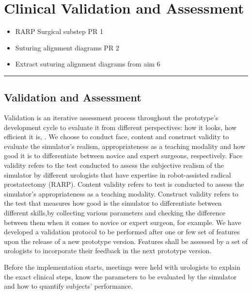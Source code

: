 
\section{Clinical Validation and Assessment}
\label{sec:clinical_validation}

\begin{itemize}
  \item RARP Surgical substep PR 1 
  \item Suturing alignment diagrams PR 2 
  \item Extract suturing alignment diagrams from aim 6 
\end{itemize}

\hrule%

\subsection{Validation and Assessment}
\label{ssec:validation_assessment}


Validation is an iterative assessment process throughout the prototype's development cycle to evaluate it from different perspectives: how it looks, how efficient it is, \etc. We choose to conduct face, content and construct validity to evaluate the simulator's realism, appropriateness as a teaching modality and how good it is to differentiate between novice and expert surgeons, respectively.
Face validity refers to the test conducted to assess the subjective realism of the simulator by different urologists that have expertise in robot-assisted radical prostatectomy (RARP). Content validity refers to test is conducted to assess the simulator’s appropriateness as a teaching modality. Construct validity refers to the test that measures how good is the simulator to differentiate between different skills,by collecting various parameters and checking the difference between them when it comes to novice or expert surgeon, for example.
We have developed a validation protocol to be performed after one or few set of features upon the release of a new prototype version. Features shall be assessed by a set of urologists to incorporate their feedback in the next prototype version.

Before the implementation starts, meetings were held with urologists to explain the exact clinical steps, know the parameters to be evaluated by the simulator and how to quantify subjects' performance.

